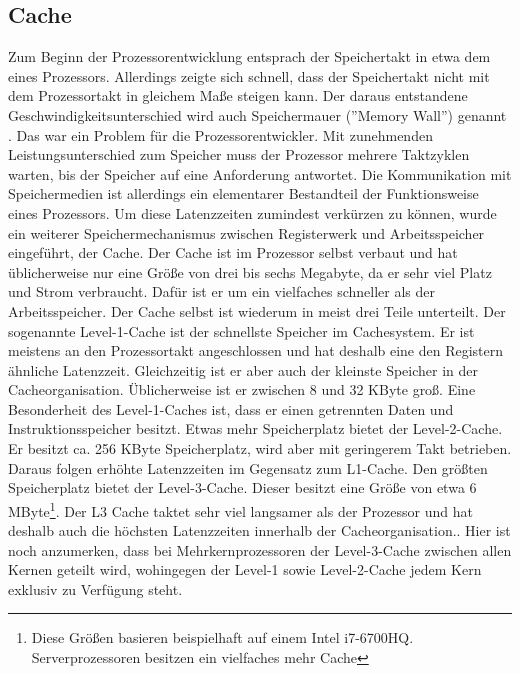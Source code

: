 \documentclass[a4paper,12pt]{article}
\begin{document}
\subsection{Cache} \label{subsec:cache}
Zum Beginn der Prozessorentwicklung entsprach der Speichertakt in etwa dem eines Prozessors. Allerdings zeigte sich schnell, dass der Speichertakt nicht mit dem Prozessortakt in gleichem Maße steigen kann. Der daraus entstandene Geschwindigkeitsunterschied wird auch Speichermauer (''Memory Wall'') genannt \cite{mckee2004reflections}.
Das war ein Problem für die Prozessorentwickler. Mit zunehmenden Leistungsunterschied zum Speicher muss der Prozessor mehrere Taktzyklen warten,  bis der Speicher auf eine Anforderung antwortet.\cite{mikroprozessortechnik2011} Die Kommunikation mit Speichermedien ist allerdings ein elementarer Bestandteil der Funktionsweise eines Prozessors. Um diese Latenzzeiten zumindest verkürzen zu können, wurde ein weiterer Speichermechanismus zwischen Registerwerk und Arbeitsspeicher eingeführt, der Cache. Der Cache ist im Prozessor selbst verbaut und hat üblicherweise nur eine Größe von drei bis sechs Megabyte, da er sehr viel Platz und Strom verbraucht. Dafür ist er um ein vielfaches schneller als der Arbeitsspeicher. Der Cache selbst ist wiederum in meist drei Teile unterteilt. Der sogenannte Level-1-Cache ist der schnellste Speicher im Cachesystem. Er ist meistens an den Prozessortakt angeschlossen und hat deshalb eine den Registern ähnliche Latenzzeit. Gleichzeitig ist er aber auch der kleinste Speicher in der Cacheorganisation. 
Üblicherweise ist er zwischen 8 und 32 KByte groß. Eine Besonderheit des Level-1-Caches ist, dass er  einen getrennten Daten und Instruktionsspeicher besitzt. Etwas mehr Speicherplatz bietet der Level-2-Cache. Er besitzt ca. 256 KByte Speicherplatz, wird aber mit geringerem Takt betrieben. Daraus folgen erhöhte Latenzzeiten im Gegensatz zum L1-Cache. Den größten Speicherplatz bietet der Level-3-Cache. Dieser besitzt eine Größe von etwa 6 MByte\footnote{Diese Größen basieren beispielhaft auf einem Intel i7-6700HQ. Serverprozessoren besitzen ein vielfaches mehr Cache}. Der L3 Cache taktet sehr viel langsamer als der Prozessor und hat deshalb auch die höchsten Latenzzeiten innerhalb der Cacheorganisation.\cite{molka2009memory}. Hier ist noch anzumerken, dass bei Mehrkernprozessoren der Level-3-Cache zwischen allen Kernen geteilt wird, wohingegen der Level-1 sowie Level-2-Cache jedem Kern exklusiv zu Verfügung steht.
\end{document}

